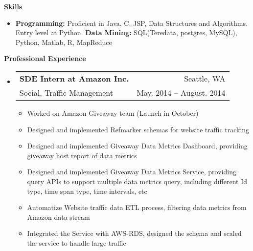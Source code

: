\documentclass[letterpaper,10pt]{article}
\makeatletter
\newcommand{\resitem}[1]{\item #1 \vspace{-2pt}}
\newcommand{\resheading}[1]{{\large \colorbox{mygrey}{\begin{minipage}{\textwidth}{\textbf{#1 \vphantom{p\^{E}}}}\end{minipage}}}}
\newcommand{\ressubheading}[4]{
\begin{tabular*}{6.5in}{l@{\extracolsep{\fill}}r}
		\textbf{#1} & #2 \\
		#3 & #4 \\
\end{tabular*}\vspace{-6pt}}
\makeatother
\begin{document}
\resheading{{Skills}}
	\begin{itemize}
		\item
            \textbf{Programming:} Proficient in Java, C, JSP, Data Structures and Algorithms. Entry level at Python.
            \textbf{Data Mining:} SQL(Teredata, postgres, MySQL), Python, Matlab, R, MapReduce 
	\end{itemize} %

\resheading{Professional Experience}
	\begin{itemize}
		\item
			\ressubheading{SDE Intern at Amazon Inc.}{Seattle, WA}{Social, Traffic Management}{May. 2014 -- August. 2014}
			{\begin{itemize}
				\resitem{Worked on Amazon Giveaway team (Launch in October)}
                \resitem{Designed and implemented Refmarker schemas for website traffic tracking}
				\resitem{Designed and implemented Giveaway Data Metrics Dashboard, providing giveaway host  report of data metrics}
				\resitem{Designed and implemented Giveaway Data Metrics Service, providing query APIs to support multiple data metrics query, including different Id type, time span type, time intervals, etc}
				\resitem{Automatize Website traffic data ETL process, filtering data metrics from Amazon data stream}
				\resitem{Integrated the Service with AWS-RDS, designed the schema and scaled the service to handle large traffic}
			\end{itemize}
			}	
	\end{itemize}
			
\end{document}
